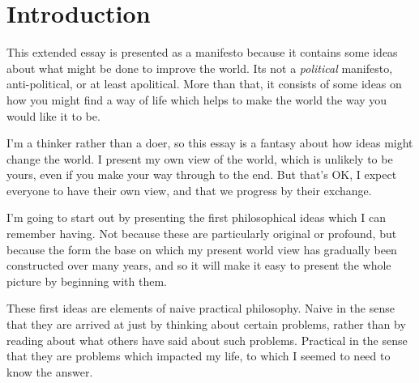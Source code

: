
\section{Introduction}\label{Introduction}

This extended essay is presented as a manifesto because it contains some ideas about what might be done to improve the world.
Its not a {\it political} manifesto, anti-political, or at least apolitical.  
More than that, it consists of some ideas on how you might find a way of life which helps to make the world the way you would like it to be.

I'm a thinker rather than a doer, so this essay is a fantasy about how ideas might change the world.
I present my own view of the world, which is unlikely to be yours, even if you make your way through to the end.
But that's OK, I expect everyone to have their own view, and that we progress by their exchange.

I'm going to start out by presenting the first philosophical ideas which I can remember having.
Not because these are particularly original or profound, but because the form the base on which my present world view has gradually been constructed over many years, and so it will make it easy to present the whole picture by beginning with them.

These first ideas are elements of naive practical philosophy.
Naive in the sense that they are arrived at just by thinking about certain problems, rather than by reading about what others have said about such problems.
Practical in the sense that they are problems which impacted my life, to which I seemed to need to know the answer.
